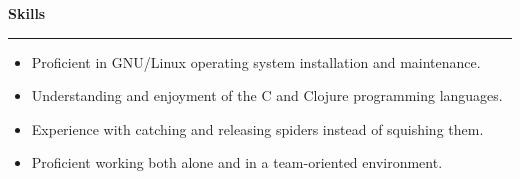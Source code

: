\documentclass[a4paper, 12pt]{article}
\begin{document}
\begin{flushleft}
{\fontsize{12pt}{12pt}\selectfont\textbf{Skills}}
\noindent\rule{\textwidth}{0.4pt}
\end{flushleft}
\begin{flushleft}
\begin{multicols}{2}
\begin{itemize}
\item Proficient in GNU/Linux operating system installation and maintenance.
\item Understanding and enjoyment of the C and Clojure programming languages.
\item Experience with catching and releasing spiders instead of squishing them.
\item Proficient working both alone and in a team-oriented environment.
\end{itemize}
\end{multicols}
\end{flushleft}
\end{document}
